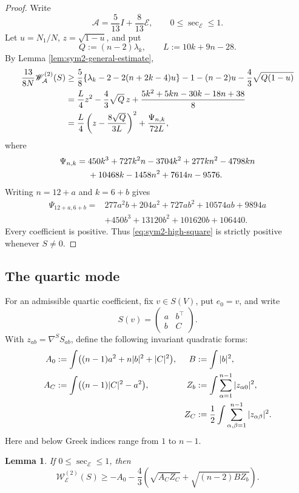\documentclass[reqno,11pt]{amsart}
\newtheorem{lemma}[theorem]{Lemma}
\theoremstyle{definition}
\newcommand{\cA}{\mathcal A}
\newcommand{\cE}{\mathcal E}
\begin{document}
\begin{proof}
Write
$$
  \cA=\frac5{13}I+\frac8{13}\cE,
  \qquad 0\leq\sec_{\cE}\leq1.
$$
Let $u=N_1/N$, $z=\sqrt{1-u}$, and put
$$
  Q:=(n-2)\lambda_k,
  \qquad
  L:=10k+9n-28.
$$
By Lemma \ref{lem:sym2-general-estimate},
\begin{align}
 \frac{13}{8N}\mathscr W^{(2)}_{\cA}(S)
 &\geq
 \frac58\{\lambda_k-2-2(n+2k-4)u\}
 -1-(n-2)u-\frac43\sqrt{Q(1-u)}\notag\\
 &=\frac L4z^2-\frac43\sqrt Q\,z
   +\frac{5k^2+5kn-30k-18n+38}{8}\notag\\
 &=\frac L4\left(z-\frac{8\sqrt Q}{3L}\right)^2
   +\frac{\Psi_{n,k}}{72L},
 \label{eq:sym2-high-square}
\end{align}
where
\begin{align}
 \Psi_{n,k}={}&450k^3+727k^2n-3704k^2
 +277kn^2-4798kn\notag\\
 &+10468k-1458n^2+7614n-9576.
 \label{eq:sym2-Psi}
\end{align}
Writing $n=12+a$ and $k=6+b$ gives
\begin{align*}
 \Psi_{12+a,6+b}={}&277a^2b+204a^2+727ab^2+10574ab+9894a\\
 &+450b^3+13120b^2+101620b+106440.
\end{align*}
Every coefficient is positive. Thus \eqref{eq:sym2-high-square} is strictly
positive whenever $S\neq0$.
\end{proof}

\subsection{The quartic mode}

For an admissible quartic coefficient, fix $v\in S(V)$, put $e_0=v$, and write
$$
  S(v)=\begin{pmatrix}a&b^\top\\b&C\end{pmatrix}.
$$
With $z_{ab}=\nabla^SS_{ab}$, define the following invariant quadratic
forms:
\begin{align}
 A_0&:=\int\bigl((n-1)a^2+n|b|^2+|C|^2\bigr),
 &B&:=\int|b|^2,\notag\\
 A_C&:=\int\bigl((n-1)|C|^2-a^2\bigr),
 &Z_b&:=\int\sum_{\alpha=1}^{n-1}|z_{\alpha0}|^2,\notag\\
 &&Z_C&:=\frac12\int\sum_{\alpha,\beta=1}^{n-1}
 |z_{\alpha\beta}|^2.\notag
\end{align}
Here and below Greek indices range from $1$ to $n-1$.

\begin{lemma}
\label{lem:quartic-residual}
If $0\leq\sec_{\cE}\leq1$, then
\begin{equation}\label{eq:quartic-residual}
 \mathscr W^{(2)}_{\cE}(S)
 \geq-A_0-\frac43
 \left(\sqrt{A_CZ_C}+\sqrt{(n-2)BZ_b}\right).
\end{equation}
\end{lemma}
\end{document}
